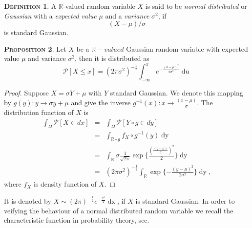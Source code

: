 \documentclass[a4paper, twoside, 11pt]{article}
\theoremstyle{definition}
\newtheorem{definition}{\scshape Definition}[section]
\newtheorem{proposition}[definition]{\scshape Proposition}
\begin{document}
\begin{definition}
  A $\mathbb{R}$-valued random variable $X$ is said to be \emph{normal distributed} or \emph{Gaussian} with a \emph{expected value} $\mu$ and a \emph{variance} $\sigma^2$, if
\[
  (X-\mu) / \sigma
\]
is standard Gaussian.
\end{definition}

\begin{proposition}
  Let $X$ be a $\mathbb{R}-valued$ Gaussian random variable with expected value $\mu$ and variance $\sigma^2$, then it is distributed as
  \begin{equation*}
	\mathcal{P}[X\le x] = (2\pi\sigma^2)^{-\frac{1}{2}}\int_{-\infty}^x e^{-\frac{(u-\mu)^2}{2\sigma^2}}\mathop{du}
  \end{equation*}
\end{proposition}

\begin{proof}
  Suppose $X = \sigma Y + \mu$ with $Y$ standard Gaussian. We denote this mapping by $g(y) : y \rightarrow \sigma y + \mu$ and give the inverse $g^{-1}(x) : x \rightarrow \frac{(x-\mu)}{\sigma}$. The distribution function of $X$ is 
  \begin{eqnarray*}
	\int_\Omega \mathcal{P}[X \in dx] &=& \int_\Omega \mathcal{P}[Y \circ g \in dy] \\
	&=& \int_{\mathbb{R}\circ g} f_X \circ g^{-1}(y) \mathop{dy}\\
	&=& \int_{\mathbb{R}} \sigma \frac{1}{\sqrt{2\pi}} \exp\{\frac{(\frac{(y-\mu)}{\sigma})^2}{2}\} \mathop{dy}\\
	&=&  (2\pi\sigma^2)^{-\frac{1}{2}}\int_{\mathbb{R}} \exp\{-\frac{(y-\mu)^2}{2\sigma^2}\}\mathop{dy} ,
  \end{eqnarray*}
 where $f_X$ is density function of $X$.
\end{proof}

It is denoted by $X \sim (2\pi)^{-\frac{1}{2}}e^{-\frac{x^2}{2}}\mathop{dx} $, if $X$ is standard Gaussian. In order to veifying the behaviour of a normal distributed random variable we recall the characteristic function in probability theory, see\cite{bauer}. 
\end{document}
